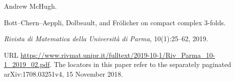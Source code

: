 Andrew McHugh.

\newblock Bott--Chern--Aeppli, Dolbeault, and Fr{\"o}licher on compact
  complex $3$-folds.

\newblock \emph{Rivista di Matematica della Universit\`a di Parma},
  10(1):25--62, 2019.

\newblock URL
  \url{https://www.rivmat.unipr.it/fulltext/2019-10-1/Riv_Parma_10-1_2019_02.pdf}.
\newblock The locators in this paper refer to the separately paginated
  arXiv:1708.03251v4, 15 November 2018.
